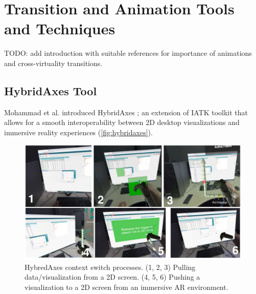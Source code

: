 \documentclass{vgtc}                          %
\begin{document}
\section{Transition and Animation Tools and Techniques}

TODO: add introduction with suitable references for importance of animations
and cross-virtuality transitions.
\subsection{HybridAxes Tool}
Mohammad et al. introduced HybridAxes \cite{hybridaxes_tool}; an extension of
IATK toolkit that allows for a smooth interoperability between 2D desktop
visualizations and immersive reality experiences (\autoref{fig:hybridaxes}).

\medskip

\begin{figure}[tb]
	\centering
	\includegraphics[width=\columnwidth]{hybridaxes}
	\caption[Caption for RagRug]{HybredAxes context switch processes. (1, 2, 3)
		Pulling data/visualization from a 2D screen. (4, 5, 6) Pushing a
		visualization to a 2D screen from an immersive AR environment.}
	\label{fig:hybridaxes}
\end{figure}
\end{document}

